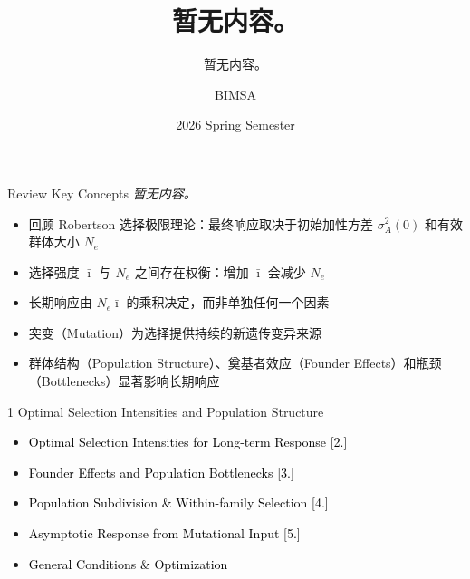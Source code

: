 \documentclass[10pt, aspectratio=169]{ctexbeamer}
\title{暂无内容。}
\subtitle{暂无内容。}
\author{BIMSA}
\date{2026 Spring Semester}
\begin{document}
{
\begin{frame}
  \titlepage
\end{frame}
}

\begin{frame}{Review Key Concepts}
  \textit{暂无内容。}
  \vspace{0.3cm}
  \begin{itemize}
    \item 回顾 Robertson 选择极限理论：最终响应取决于初始加性方差 $\sigma_A^2(0)$ 和有效群体大小 $N_e$
    \item 选择强度 $\bar{\imath}$ 与 $N_e$ 之间存在权衡：增加 $\bar{\imath}$ 会减少 $N_e$
    \item 长期响应由 $N_e \bar{\imath}$ 的乘积决定，而非单独任何一个因素
    \item 突变（Mutation）为选择提供持续的新遗传变异来源
    \item 群体结构（Population Structure）、奠基者效应（Founder Effects）和瓶颈（Bottlenecks）显著影响长期响应
  \end{itemize}
\end{frame}

\begin{frame}{1 Optimal Selection Intensities and Population Structure}
  \vfill
  \begin{center}
    \begin{minipage}{0.7\textwidth}
      \begin{itemize}
        \setlength{\itemsep}{0.3\baselineskip}
        \item[\textcolor{black}{\textbf{1.}}] \textcolor{black}{Optimal Selection Intensities for Long-term Response [2.]}
        \item[\textcolor{black}{\textbf{2.}}] \textcolor{black}{Founder Effects and Population Bottlenecks [3.]}
        \item[\textcolor{black}{\textbf{3.}}] \textcolor{black}{Population Subdivision \& Within-family Selection [4.]}
        \item[\textcolor{black}{\textbf{4.}}] \textcolor{black}{Asymptotic Response from Mutational Input [5.]}
        \item[\textcolor{black}{\textbf{5.}}] \textcolor{black}{General Conditions \& Optimization}
      \end{itemize}
    \end{minipage}
  \end{center}
  \vfill
\end{frame}
\end{document}

